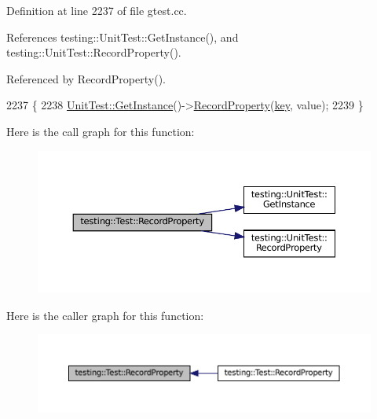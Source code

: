 Definition at line 2237 of file gtest.\+cc.



References testing\+::\+Unit\+Test\+::\+Get\+Instance(), and testing\+::\+Unit\+Test\+::\+Record\+Property().



Referenced by Record\+Property().


\begin{DoxyCode}
2237                                                                       \{
2238   \hyperlink{classtesting_1_1UnitTest_a24192400b70b3b946746954e9574fb8e}{UnitTest::GetInstance}()->\hyperlink{classtesting_1_1UnitTest_a2c96a4a02c34095e07c6999e7686367f}{RecordProperty}(\hyperlink{namespacekeyboard__server__node_af0ebd8a9e1564ddc13a227c727602466}{key}, value);
2239 \}
\end{DoxyCode}
Here is the call graph for this function\+:
\nopagebreak
\begin{figure}[H]
\begin{center}
\leavevmode
\includegraphics[width=350pt]{classtesting_1_1Test_a7b20a48c0bbc9dd1fe96715e4a5c0164_cgraph}
\end{center}
\end{figure}
Here is the caller graph for this function\+:
\nopagebreak
\begin{figure}[H]
\begin{center}
\leavevmode
\includegraphics[width=350pt]{classtesting_1_1Test_a7b20a48c0bbc9dd1fe96715e4a5c0164_icgraph}
\end{center}
\end{figure}
\mbox{\label{classtesting_1_1Test_afb8d29af28e48dc65b2b743f1874ccfe}} 
